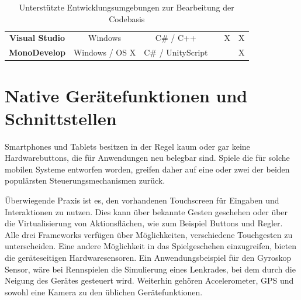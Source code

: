 \begin{table}[htbp]
{\begin{tabular}{cccccc}
			\rowcolor[HTML]{C0C0C0} 
			\textbf{Visual Studio}                         & Windows                                        & C\# / C++                                          &                                        & X                                         & X                                       \\
			\textbf{MonoDevelop}                           & Windows / OS X                                 & C\# / UnityScript                                  &                                        &                                           & X                                      
		\end{tabular}
	}
	\caption{Unterstützte Entwicklungsumgebungen zur Bearbeitung der Codebasis} \citep{libGDX_wiki, cocos2d_main_features, unity_code_editor}
	\label{ides}
\end{table}

\section{Native Gerätefunktionen und Schnittstellen}
Smartphones und Tablets besitzen in der Regel kaum oder gar keine Hardwarebuttons, die für Anwendungen neu belegbar sind. Spiele die für solche mobilen Systeme entworfen worden, greifen daher auf eine oder zwei der beiden populärsten Steuerungsmechanismen zurück.

\bigskip
Überwiegende Praxis ist es, den vorhandenen Touchscreen für Eingaben und Interaktionen zu nutzen. Dies kann über bekannte Gesten geschehen oder über die Virtualisierung von Aktionsflächen, wie zum Beispiel Buttons und Regler. Alle drei Frameworks verfügen über Möglichkeiten, verschiedene Touchgesten zu unterscheiden.
Eine andere Möglichkeit in das Spielgeschehen einzugreifen, bieten die geräteseitigen Hardwaresensoren. Ein Anwendungsbeispiel für den Gyroskop Sensor, wäre bei Rennspielen die Simulierung eines Lenkrades, bei dem durch die Neigung des Gerätes gesteuert wird. Weiterhin gehören Accelerometer, GPS und sowohl eine Kamera zu den üblichen Gerätefunktionen.

